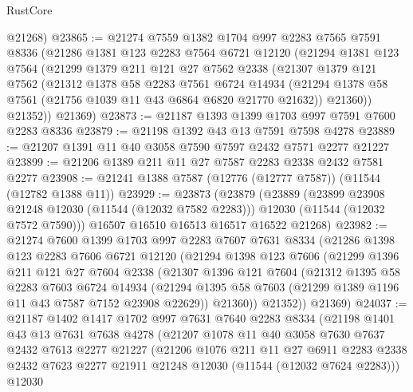 \begin{lexlean}{RustCore}
\begin{coremodule}
      @21268)
@23865 := @21274
    @7559
    @1382
    @1704
    @997
    @2283
    @7565
    @7591
    @8336
    (@21286
      @1381
      @123
      @2283
      @7564
      @6721
      @12120
      (@21294
        @1381
        @123
        @7564
        (@21299
          @1379
          @211
          @121
          @27
          @7562
          @2338
          (@21307
            @1379
            @121
            @7562
            (@21312
              @1378
              @58
              @2283
              @7561
              @6724
              @14934
              (@21294 @1378 @58 @7561 (@21756 @1039 @11 @43 @6864 @6820 @21770 @21632))
              @21360))
          @21352))
      @21369)
@23873 := @21187 @1393 @1399 @1703 @997 @7591 @7600 @2283 @8336
@23879 := @21198 @1392 @43 @13 @7591 @7598 @4278
@23889 := @21207 @1391 @11 @40 @3058 @7590 @7597 @2432 @7571 @2277 @21227
@23899 := @21206 @1389 @211 @11 @27 @7587 @2283 @2338 @2432 @7581 @2277
@23908 := @21241 @1388 @7587 (@12776 (@12777 @7587)) (@11544 (@12782 @1388 @11))
@23929 := @23873
    (@23879
      (@23889
        (@23899 @23908 @21248 @12030 (@11544 (@12032 @7582 @2283)))
        @12030
        (@11544 (@12032 @7572 @7590)))
      @16507
      @16510
      @16513
      @16517
      @16522
      @21268)
@23982 := @21274
    @7600
    @1399
    @1703
    @997
    @2283
    @7607
    @7631
    @8334
    (@21286
      @1398
      @123
      @2283
      @7606
      @6721
      @12120
      (@21294
        @1398
        @123
        @7606
        (@21299
          @1396
          @211
          @121
          @27
          @7604
          @2338
          (@21307
            @1396
            @121
            @7604
            (@21312
              @1395
              @58
              @2283
              @7603
              @6724
              @14934
              (@21294 @1395 @58 @7603 (@21299 @1389 @1196 @11 @43 @7587 @7152 @23908 @22629))
              @21360))
          @21352))
      @21369)
@24037 := @21187
    @1402
    @1417
    @1702
    @997
    @7631
    @7640
    @2283
    @8334
    (@21198
      @1401
      @43
      @13
      @7631
      @7638
      @4278
      (@21207
        @1078
        @11
        @40
        @3058
        @7630
        @7637
        @2432
        @7613
        @2277
        @21227
        (@21206
          @1076
          @211
          @11
          @27
          @6911
          @2283
          @2338
          @2432
          @7623
          @2277
          @21911
          @21248
          @12030
          (@11544 (@12032 @7624 @2283)))
        @12030

\end{coremodule}
\end{lexlean}
